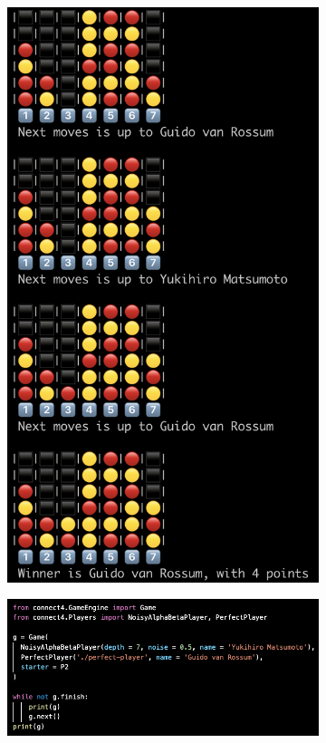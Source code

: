 \documentclass{article}
\begin{document}
\begin{figure}
\begin{subfigure}{0.4\textwidth}
      \includegraphics[width=\linewidth]{img/gameend.png}
      \subcaption{}
    \end{subfigure}
    \medskip
    
    \begin{subfigure}{0.9\textwidth}
      \includegraphics[width=\linewidth]{img/gamecode.png}
      \subcaption{}
    \end{subfigure}
    

\end{figure}
\end{document}
